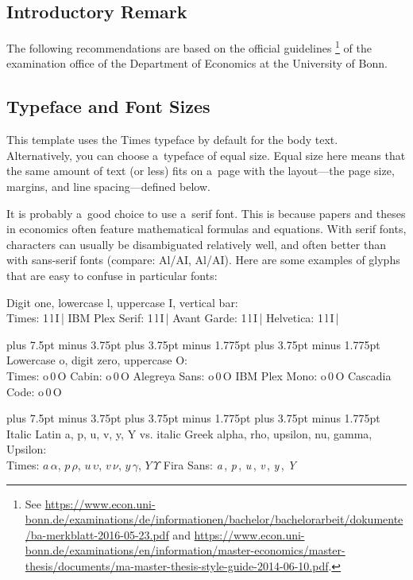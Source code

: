 \documentclass[12pt, a4paper, oneside]{article}
\newlength{\baselinedist}
\newlength{\smalllinespacing}
\newlength{\fsnormal}
\newlength{\fssmall}
\let \normalsizeOrig \normalsize
\let \smallOrig \small
\def\normalsize{%
		\normalsizeOrig%
		\fontsize{\fsnormal}{\baselinedist}\selectfont%
		\abovedisplayskip 13.5pt plus 6.75pt minus 3.375pt%
		\belowdisplayskip \abovedisplayskip%
		\abovedisplayshortskip 6.75pt plus 3.375pt minus 1.6875pt%
		\belowdisplayshortskip 6.75pt plus 3.375pt minus 1.6875pt%
	}
\def\normalsize{%
		\normalsizeOrig%
		\fontsize{\fsnormal}{\baselinedist}\selectfont%
		\abovedisplayskip 15pt plus 7.5pt minus 3.75pt%
		\belowdisplayskip \abovedisplayskip%
		\abovedisplayshortskip 7.5pt plus 3.75pt minus 1.775pt%
		\belowdisplayshortskip 7.5pt plus 3.75pt minus 1.775pt%
	}
\renewcommand{\small}{\smallOrig\fontsize{\fssmall}{\smalllinespacing}\selectfont}
\theoremstyle{Plain}
\theoremstyle{Definition}
\theoremstyle{Remark}
\begin{document}
\subsection{Introductory Remark}
The following recommendations are based on the official guidelines%
\footnote{See \url{https://www.econ.uni-bonn.de/examinations/de/informationen/bachelor/bachelorarbeit/dokumente/ba-merkblatt-2016-05-23.pdf} and \url{https://www.econ.uni-bonn.de/examinations/en/information/master-economics/master-thesis/documents/ma-master-thesis-style-guide-2014-06-10.pdf}.}
of the examination office of the Department of Economics at the University of Bonn.

\subsection{Typeface and Font Sizes}
This template uses the Times typeface by default for the body text. Alternatively, you can choose a~typeface of equal size. Equal size here means that the same amount of text (or less) fits on a~page with the layout---the page size, margins, and line spacing---defined below.

It is probably a~good choice to use a~serif font. This is because papers and theses in economics often feature mathematical formulas and equations. With serif fonts, characters can usually be disambiguated relatively well, and often better than with sans-serif fonts (compare: Al/AI, {\selectfont Al/AI}). Here are some examples of glyphs that are easy to confuse in particular fonts:
\begin{tcolorbox}
	Digit one, lowercase l, uppercase I, vertical bar: \\
	\small%
	{\selectfont Times: 1\,l\,I\,|} \quad
	{\selectfont IBM Plex Serif: 1\,l\,I\,|} \quad
	{\selectfont Avant Garde: 1\,l\,I\,|} \quad
	{\selectfont Helvetica: 1\,l\,I\,|} 
	\par \smallskip
	\normalsize%
	Lowercase o, digit zero, uppercase O: \\
	\small%
	{\selectfont Times: o\,0\,O}\quad
	{\selectfont Cabin: o\,0\,O}\quad
	{\selectfont Alegreya Sans: o\,0\,O}\quad
	{\selectfont IBM Plex Mono: o\,0\,O}\quad
	{\selectfont Cascadia Code: o\,0\,O}
	\par \smallskip
	\normalsize%
	Italic Latin a, p, u, v, y, Y vs. italic Greek alpha, rho, upsilon, nu, gamma, Upsilon: \\
	\small%
	Times: $a \, \alpha$, $p \, \rho$, $u \, \upsilon$, $v \, \nu$, $y \, \gamma$, $Y \, \mathit{\Upsilon}$
	\quad
	{\selectfont Fira Sans: {\itshape a\,\textalpha}, {\itshape p\,\textrho}, {\itshape u\,\textupsilon}, {\itshape v\,\textnu}, {\itshape y\,\textgamma}, {\itshape Y\,\textUpsilon}}
\end{tcolorbox}
\end{document}
